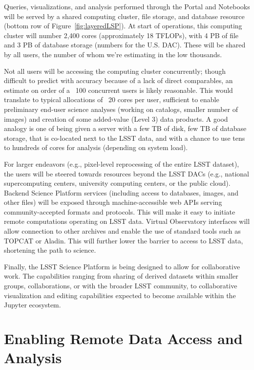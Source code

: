 \documentclass[DM,lsstdraft,toc]{lsstdoc}
\begin{document}
Queries, visualizations, and analysis performed through the Portal and
Notebooks will be served by a shared computing cluster, file storage, and
database resource (bottom row of Figure~\ref{fig:layeredLSP}).  At start of operations,
this computing cluster will number 2,400 cores (approximately 18 TFLOPs),
with 4 PB of file and 3 PB of database storage (numbers for the U.S.  DAC). 
These will be shared by all users, the number of whom we’re estimating in
the low thousands.

Not all users will be accessing the computing cluster concurrently; though
difficult to predict with accuracy because of a lack of direct comparables,
an estimate on order of a ~100 concurrent users is likely reasonable.  This
would translate to typical allocations of ~20 cores per user, sufficient to
enable preliminary end-user science analyses (working on catalogs, smaller
number of images) and creation of some added-value (Level 3) data products. 
A good analogy is one of being given a server with a few TB of disk, few TB
of database storage, that is co-located next to the LSST data, and with a
chance to use tens to hundreds of cores for analysis (depending on system
load).

For larger endeavors (e.g., pixel-level reprocessing of the entire LSST
dataset), the users will be steered towards resources beyond the LSST DACs
(e.g., national supercomputing centers, university computing centers, or the
public cloud).  Backend Science Platform services (including access to
databases, images, and other files) will be exposed through
machine-accessible web APIs serving community-accepted formats and
protocols.  This will make it easy to initiate remote computations operating
on LSST data.  Virtual Observatory interfaces will allow connection to other
archives and enable the use of standard tools such as TOPCAT or Aladin. 
This will further lower the barrier to access to LSST data, shortening the
path to science.

Finally, the LSST Science Platform is being designed to allow for
collaborative work.  The capabilities ranging from sharing of derived
datasets within smaller groups, collaborations, or with the broader LSST
community, to collaborative visualization and editing capabilities expected
to become available within the Jupyter ecosystem.

\section{Enabling Remote Data Access and Analysis}
\end{document}

